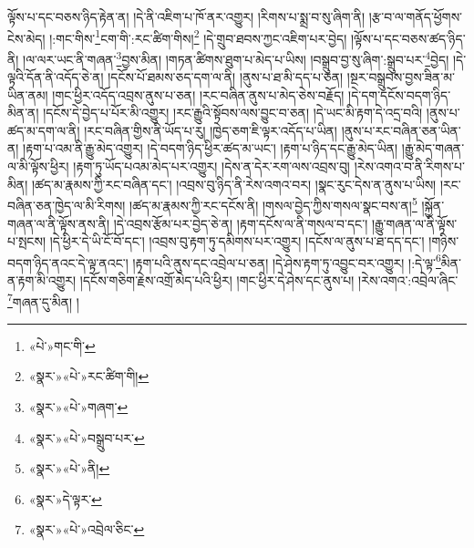 ལྟོས་པ་དང་བཅས་ཉིད་རྟེན་ན། །དེ་ནི་འཇིག་པ་ཁོ་ནར་འགྱུར། །རིགས་པ་སྨྲ་བ་སུ་ཞིག་ནི། །རྩ་བ་ལ་གནོད་ཕྱོགས་ངེས་མེད། །:གང་གིས་\footnote{«པེ་»གང་གི་}ངག་གི་:རང་ཚིག་གིས།\footnote{«སྣར་»«པེ་»རང་ཚིག་གི།} །དེ་གྲུབ་ཐབས་ཀྱང་འཇིག་པར་བྱེད། །ལྟོས་པ་དང་བཅས་ཚད་ཉིད་ནི། །ལ་ལར་ཡང་ནི་གཞན་\footnote{«སྣར་»«པེ་»གཞག་}བྱས་མིན། །གཏན་ཚིགས་ཐུག་པ་མེད་པ་ཡིས། །བསྒྲུབ་བྱ་སུ་ཞིག་:སྒྲུབ་པར་\footnote{«སྣར་»«པེ་»བསྒྲུབ་པར་}བྱེད། །དེ་ལྟའི་དོན་ནི་འདོད་ཅེ་ན། །དངོས་པོ་ཐམས་ཅད་དག་ལ་ནི། །ནུས་པ་ཐ་མི་དད་པ་ཅན། །སྔར་བསྒྲུབས་བྱས་ཟིན་མ་ཡིན་ནམ། །གང་ཕྱིར་འདོད་འབྲས་ནུས་པ་ཅན། །རང་བཞིན་ནུས་པ་མེད་ཅེས་བརྗོད། །དེ་དག་དངོས་བདག་ཉིད་མིན་ན། །དངོས་དེ་བྱེད་པ་པོར་མི་འགྱུར། །རང་རྒྱུའི་སྟོབས་ལས་བྱུང་བ་ཅན། །དེ་ཡང་མི་རྟག་དེ་འདྲ་བའི། །ནུས་པ་ཚད་མ་དག་ལ་ནི། །རང་བཞིན་གྱིས་ནི་ཡོད་པ་རུ། །ཁྱེད་ཅག་ཇི་ལྟར་འདོད་པ་ཡིན། །ནུས་པ་རང་བཞིན་ཅན་ཡིན་ན། །རྟག་པ་འམ་ནི་རྒྱུ་མེད་འགྱུར། །དེ་བདག་ཉིད་ཕྱིར་ཚད་མ་ཡང་། །རྟག་པ་ཉིད་དང་རྒྱུ་མེད་ཡིན། །རྒྱུ་མེད་གཞན་ལ་མི་ལྟོས་ཕྱིར། །རྟག་ཏུ་ཡོད་པའམ་མེད་པར་འགྱུར། །དེས་ན་དེར་རག་ལས་འབྲས་བུ། །རེས་འགའ་བ་ནི་རིགས་པ་མིན། །ཚད་མ་རྣམས་ཀྱི་རང་བཞིན་དང་། །འབྲས་བུ་ཉིད་ནི་རེས་འགའ་བར། །སྣང་རུང་དེས་ན་ནུས་པ་ཡིས། །རང་བཞིན་ཅན་ཁྱེད་ལ་མི་རིགས། །ཚད་མ་རྣམས་ཀྱི་རང་དངོས་ནི། །གསལ་བྱེད་ཀྱིས་གསལ་སྣང་བས་ན།\footnote{«སྣར་»«པེ་»ནི།} །སྐྱོན་གཞན་ལ་ནི་ལྟོས་ནས་ནི། །དེ་འབྲས་རྩོམ་པར་བྱེད་ཅེ་ན། །རྟག་དངོས་ལ་ནི་གསལ་བ་དང་། །རྒྱུ་གཞན་ལ་ནི་ལྟོས་པ་སྤངས། །དེ་ཕྱིར་དེ་ཡི་ངོ་བོ་དང་། །འབྲས་བུ་རྟག་ཏུ་དམིགས་པར་འགྱུར། །དངོས་ལ་ནུས་པ་ཐ་དད་དང་། །གཉིས་བདག་ཉིད་ནའང་དེ་ལྟ་ནའང་། །རྟག་པའི་ནུས་དང་འབྲེལ་པ་ཅན། །དེ་ཤེས་རྟག་ཏུ་འབྱུང་བར་འགྱུར། །:དེ་ལྟ་\footnote{«སྣར་»དེ་ལྟར་}མིན་ན་རྟག་མི་འགྱུར། །དངོས་གཅིག་རྗེས་འགྲོ་མེད་པའི་ཕྱིར། །གང་ཕྱིར་དེ་ཤེས་དང་ནུས་པ། །རེས་འགའ་:འབྲེལ་ཞིང་\footnote{«སྣར་»«པེ་»འབྲེལ་ཅིང་}གཞན་དུ་མིན། །
